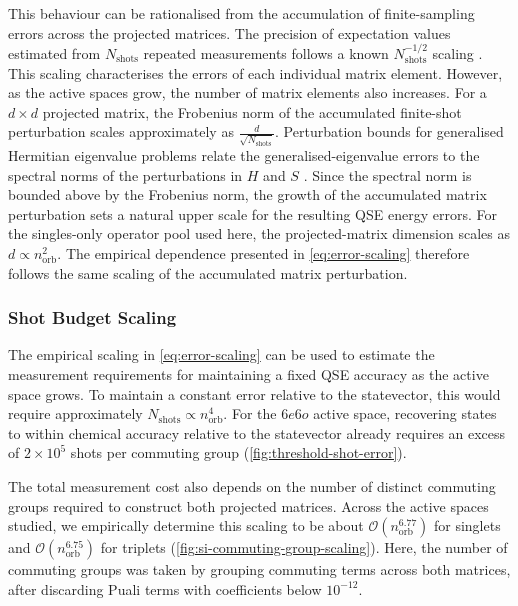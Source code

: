 This behaviour can be rationalised from the accumulation of finite-sampling errors across the projected matrices. 
The precision of expectation values estimated from $N_{\mathrm{shots}}$ repeated measurements follows a known $N_{\mathrm{shots}}^{-1/2}$ scaling \cite{Knill2007PrecisionScaling}. 
This scaling characterises the errors of each individual matrix element. 
However, as the active spaces grow, the number of matrix elements also increases. For a $d \times d$ projected matrix, the Frobenius norm of the accumulated finite-shot perturbation scales approximately as $\frac{d}{\sqrt{N_{\mathrm{shots}}}}$. 
Perturbation bounds for generalised Hermitian eigenvalue problems relate the generalised-eigenvalue errors to the spectral norms of the perturbations in $H$ and $S$ \cite{Nakatsukasa2010ErrorBounds}. 
Since the spectral norm is bounded above by the Frobenius norm, the growth of the accumulated matrix perturbation sets a natural upper scale for the resulting QSE energy errors. 
For the singles-only operator pool used here, the projected-matrix dimension scales as $d \propto n_{\mathrm{orb}}^2$. The empirical dependence presented in \cref{eq:error-scaling} therefore follows the same scaling of the accumulated matrix perturbation.

\subsubsection{Shot Budget Scaling}
The empirical scaling in \cref{eq:error-scaling} can be used to estimate the measurement requirements for maintaining a fixed QSE accuracy as the active space grows. To maintain a constant error relative to the statevector, this would require approximately $N_{\mathrm{shots}} \propto n_{\mathrm{orb}}^4$. 
For the $6e6o$ active space, recovering states to within chemical accuracy relative to the statevector already requires an excess of $2 \times 10^{5}$ shots per commuting group (\cref{fig:threshold-shot-error}). 

The total measurement cost also depends on the number of distinct commuting groups required to construct both projected matrices. 
Across the active spaces studied, we empirically determine this scaling to be about $\mathcal{O}\!\left(n_{\mathrm{orb}}^{6.77}\right)$ for singlets and $\mathcal{O}\!\left(n_{\mathrm{orb}}^{6.75}\right)$ for triplets (\cref{fig:si-commuting-group-scaling}). 
Here, the number of commuting groups was taken by grouping commuting terms across both matrices, after discarding Puali terms with coefficients below $10^{-12}$. 

